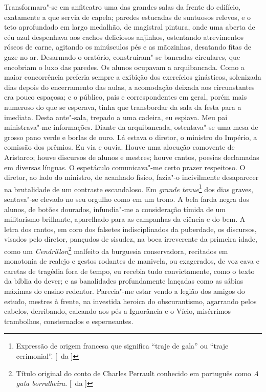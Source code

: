 Transformara"-se em anfiteatro uma das
grandes salas da frente do edifício, exatamente a que servia de capela;
paredes estucadas de suntuosos relevos, e o teto aprofundado em largo
medalhão, de magistral pintura, onde uma aberta de céu azul despenhava
aos cachos deliciosos anjinhos, ostentando atrevimentos róseos de
carne, agitando os minúsculos pés e as mãozinhas, desatando fitas de
gaze no ar. Desarmado o oratório, construíram"-se bancadas circulares,
que encobriam o luxo das paredes. Os alunos ocupavam a arquibancada.
Como a maior concorrência preferia sempre a exibição dos exercícios
ginásticos, solenizada dias depois do encerramento das aulas, a
acomodação deixada aos circunstantes era pouco espaçosa; e o público,
pais e correspondentes em geral, porém mais numeroso do que se
esperava, tinha que transbordar da sala da festa para a imediata. Desta
ante"-sala, trepado a uma cadeira, eu espiava. Meu pai ministrava"-me
informações. Diante da arquibancada, ostentava"-se uma mesa de grosso
pano verde e borlas de ouro. Lá estava o diretor, o ministro do
Império, a comissão dos prêmios. Eu via e ouvia. Houve uma alocução
comovente de Aristarco; houve discursos de alunos e mestres; houve
cantos, poesias declamadas em diversas línguas. O espetáculo
comunicava"-me certo prazer respeitoso. O diretor, ao lado do
ministro, de acanhado físico, fazia"-o incivilmente desaparecer na
brutalidade de um contraste escandaloso. Em \textit{grande tenue}\footnote{ Expressão 
de origem francesa que significa ``traje de gala'' ou ``traje cerimonial''. [~da ]} 
dos dias graves, sentava"-se elevado no seu orgulho como em um trono. A bela
farda negra dos alunos, de botões dourados, infundia"-me a
consideração tímida de um militarismo brilhante, aparelhado para as
campanhas da ciência e do bem. A letra dos cantos, em coro dos falsetes
indisciplinados da puberdade, os discursos, visados pelo diretor,
pançudos de sisudez, na boca irreverente da primeira idade, como um
\textit{Cendrillon}\footnote{ Título original do conto de Charles Perrault 
conhecido em português como \textit{A gata borralheira}. [~da ]} 
malfeito da burguesia conservadora, recitados em monotonia
de realejo e gestos rodantes de manivela, ou exagerados, de voz cava e
caretas de tragédia fora de tempo, eu recebia tudo convictamente, como
o texto da bíblia do dever; e as banalidades profundamente lançadas
como as sábias máximas do ensino redentor. Parecia"-me estar vendo a
legião dos amigos do estudo, mestres à frente, na investida heroica do
obscurantismo, agarrando pelos cabelos, derribando, calcando aos pés a
Ignorância e o Vício, misérrimos trambolhos, consternados e esperneantes. 

